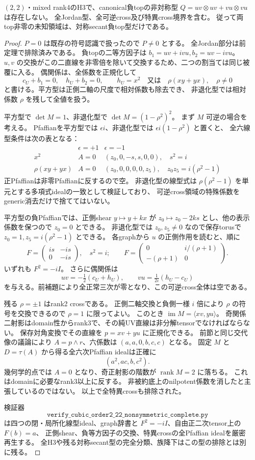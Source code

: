 \begin{theorem}\label{thm:h3-order2-22-nonsymmetric-empty}
$(2,2)$・mixed rank4のH3で、canonical負topの非対称型
$Q=uv\otimes uv+vu\otimes vu$ は存在しない。
全Jordan型、全可逆cross及び特異cross境界を含む。
従って両top非零の未知領域は、対称secant負top型だけである。
\end{theorem}
\begin{proof}
$P=0$ は既存の符号認識で扱ったので $P\ne0$ とする。
全Jordan部分は前定理で排除済みである。
負topの二等方因子は $b_1=uv+i vu,b_2=uv-i vu$。
$u,v$ の交換がこの二直線を非零倍を除いて交換するため、二つの割当ては同じ被覆に入る。
偶関係は、全係数を正規化して
\[
 c_U+b_1=0,\quad h_U+b_2=0,\qquad
 h_U=x^2\quad\text{又は}\quad \rho(xy+yx),\quad\rho\ne0
\]
と書ける。平方型は正側二軸の尺度で相対係数も除去でき、
非退化型では相対係数 $\rho$ を残して全値を扱う。

平方型で $\det M=1$、非退化型で $\det M=(1-\rho^2)^2$。
まず $M$ 可逆の場合を考える。
Pfaffianを平方型では $\epsilon i$、非退化型では $\epsilon i(1-\rho^2)$ と置くと、
全六線型条件は次の表となる：
\[
\begin{array}{c|c|c}
 &\epsilon=+1&\epsilon=-1\\\hline
 x^2&A=0&(z_0,0,-s,s,0,0),\quad s^2=i\\
 \rho(xy+yx)&A=0&(z_0,0,0,0,0,z_5),\quad z_0z_5=i(\rho^2-1)
\end{array}
\]
正Pfaffianは非零Pfaffianに反するので空。
非退化型の線型式は $\rho(\rho^2-1)$ を単元とする多項式idealの一致として検証しており、
可逆cross領域の特殊係数をgeneric消去だけで捨ててはいない。

平方型の負Pfaffianでは、正側shear $y\mapsto y+kx$ が
$z_0\mapsto z_0-2ks$ とし、他の表示係数を保つので $z_0=0$ とできる。
非退化型では $z_0,z_5\ne0$ なので保存torusで $z_0=1,z_5=i(\rho^2-1)$ とできる。
各graphから $u$ の正側作用を読むと、順に
\[
 F=\begin{pmatrix}is&-is\\0&-is\end{pmatrix},\quad s^2=i;
 \qquad
 F=\begin{pmatrix}0&i/(\rho+1)\\-(\rho+1)&0\end{pmatrix}.
\]
いずれも $F^2=-iI$。
さらに偶関係は
\[
 uv=-\tfrac12(c_U+h_U),\qquad vu=\tfrac1{2i}(h_U-c_U)
\]
を与える。前補題により全正常三次が零となり、この可逆cross全体は空である。

残る $\rho=\pm1$ はrank2 crossである。
正側二軸交換と負側一様 $i$ 倍により $\rho$ の符号を交換できるので $\rho=1$ に限ってよい。
このとき $\operatorname{im}M=\langle xv,yu\rangle$。
奇関係二射影はdomain性からrank3で、その純UV直線は非分解tensorでなければならない。
保存対角変換でその直線を $p=xv+yu$ に正規化できる。
前節と同じ交代像の議論により $A=p\wedge r$、六係数は
$(a,a,0,b,c,c)$ となる。
固定 $M$ と $D=\tau(A)$ から得る全六次Pfaffian idealは正確に
\[
 (a^2,ac,b,c^2).
\]
幾何学的点では $A=0$ となり、奇正射影の階数が $\operatorname{rank}M=2$ に落ちる。
これはdomainに必要なrank3以上に反する。
非被約底上のnilpotent係数を消したと主張しているのではない。
以上で全特異crossも排除された。

検証器
\[
\texttt{verify\_cubic\_order2\_22\_nonsymmetric\_complete.py}
\]
は四つの閉・局所化線型ideal、graph辞書と $F^2=-iI$、自由正二次tensor上の $F(b)=a$、
正側shear、負等方因子の交換、特異crossの全Pfaffian idealを厳密再生する。
全H3や残る対称secant型の完全分類、族降下はこの型の排除とは別に残る。
\end{proof}
